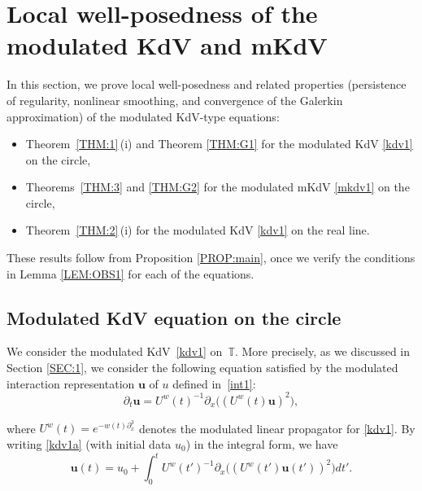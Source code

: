 \documentclass[letterpaper, 11pt,  reqno]{amsart}
\newcommand{\1}{\hspace{0.5mm}\text{I}\hspace{0.5mm}}
\newcommand{\noi}{\noindent}
\newcommand{\T}{\mathbb{T}}
\newcommand{\dx}{\partial_x}
\newcommand{\dt}{\partial_t}
\newcommand{\uw}{U^w}
\newcommand{\uu}{\mathbf{u}}
\numberwithin{equation}{section}
\numberwithin{theorem}{section}
\begin{document}
\section{Local well-posedness
of the modulated KdV and mKdV}
\label{SEC:LWP}

In this section, we prove local well-posedness
and related properties
(persistence of regularity, nonlinear smoothing,  and convergence of the Galerkin approximation)
of the modulated KdV-type equations:

\smallskip

\begin{itemize}
\item
Theorem~\ref{THM:1}\,(i) and Theorem \ref{THM:G1} 
for the modulated 
KdV \eqref{kdv1}
on the circle, 


\smallskip

\item 
Theorems~\ref{THM:3} and \ref{THM:G2}
for the modulated 
mKdV \eqref{mkdv1}
on the circle, 


\smallskip

\item 
Theorem~\ref{THM:2}\,(i)
for  the modulated KdV \eqref{kdv1}
on the real line.

\end{itemize}

\smallskip


\noi
These results follow
from 
Proposition \ref{PROP:main}, 
once we verify the conditions
in 
Lemma \ref{LEM:OBS1}
for each of the equations.

 


\subsection{Modulated KdV equation on the circle}
\label{SUBSEC:K1}
We consider the  modulated KdV~\eqref{kdv1} on~$\T$.
More precisely, as we discussed in Section \ref{SEC:1},
we consider the following equation satisfied by 
the modulated interaction representation $\uu$
of $u$ defined in~\eqref{int1}:
\begin{equation}
\dt \uu = \uw(t)^{-1} \dx\big( (\uw(t) \uu)^2\big), 
\label{kdv1a}
\end{equation}

\noi
where 
$\uw (t)=e^{-   w(t)\dx^3}  $
denotes the modulated linear propagator for \eqref{kdv1}.
By writing \eqref{kdv1a} (with initial data $u_0$) in the integral form, we have
\begin{equation}
\uu(t) = u_0 + \int_0 ^t \uw(t')^{-1}
\dx\big( (\uw(t') \uu(t'))^2\big)dt'.
\label{mild3x}
\end{equation}
\end{document}
